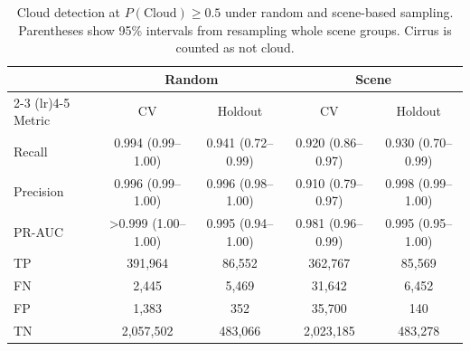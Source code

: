 \begin{table}[htbp]
    \centering
    \small
    \caption{Cloud detection at $P(\mathrm{Cloud}) \geq 0.5$ under random and scene-based sampling. Parentheses show 95\% intervals from resampling whole scene groups. Cirrus is counted as not cloud.}
    \label{tab:cloud_performance}
    \begin{tabular}{lcccc}
        \toprule
        & \multicolumn{2}{c}{Random} & \multicolumn{2}{c}{Scene} \\
        \cmidrule(lr){2-3} \cmidrule(lr){4-5}
        Metric & CV & Holdout & CV & Holdout \\
        \midrule
        Recall & 0.994 (0.99--1.00) & 0.941 (0.72--0.99) & 0.920 (0.86--0.97) & 0.930 (0.70--0.99) \\
        Precision & 0.996 (0.99--1.00) & 0.996 (0.98--1.00) & 0.910 (0.79--0.97) & 0.998 (0.99--1.00) \\
        PR-AUC & >0.999 (1.00--1.00) & 0.995 (0.94--1.00) & 0.981 (0.96--0.99) & 0.995 (0.95--1.00) \\
        \midrule
        TP & 391,964 & 86,552 & 362,767 & 85,569 \\
        FN & 2,445 & 5,469 & 31,642 & 6,452 \\
        FP & 1,383 & 352 & 35,700 & 140 \\
        TN & 2,057,502 & 483,066 & 2,023,185 & 483,278 \\
        \bottomrule
    \end{tabular}
\end{table}
